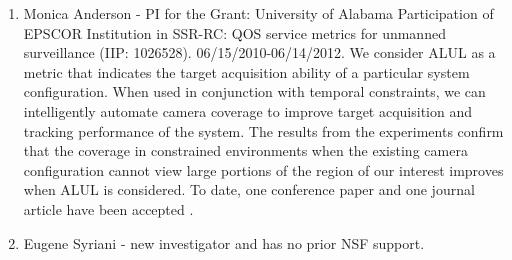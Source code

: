 \begin{enumerate}
\item Monica Anderson  - PI for the Grant: University of Alabama Participation of EPSCOR Institution in SSR-RC: QOS service metrics for unmanned surveillance (IIP: 1026528).  06/15/2010-06/14/2012. We consider ALUL as a metric that indicates the target acquisition ability of a particular system configuration. When used in conjunction with temporal constraints, we can intelligently automate camera coverage to improve target acquisition and tracking performance of the system. The results from the experiments confirm that the coverage in constrained environments when the existing camera configuration cannot view large portions of the region of our interest improves when ALUL is considered.  To date, one conference paper and one journal article have been accepted \cite{Veluchamy2011,Dukeman2011}.
\item Eugene Syriani - new investigator and has no prior NSF support.

\end{enumerate}
